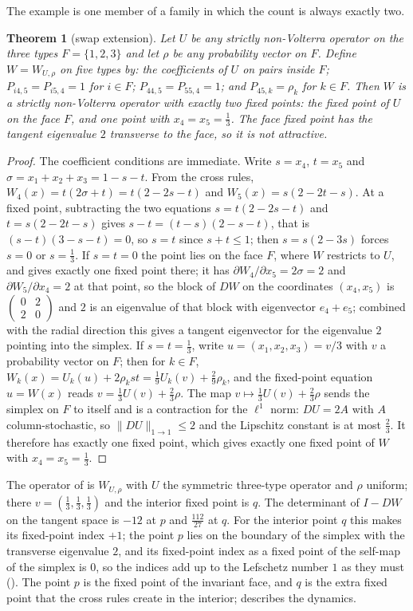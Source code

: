 \documentclass[11pt]{amsart}
\newtheorem{theorem}{Theorem}[section]
\theoremstyle{definition}
\begin{document}
The example is one member of a family in which the count is always exactly two.

\begin{theorem}[swap extension]\label{thm:swap}
Let $U$ be any strictly non-Volterra operator on the three types $F=\{1,2,3\}$ and let $\rho$ be any probability vector on $F$. Define $W=W_{U,\rho}$ on five types by: the coefficients of $U$ on pairs inside $F$; $P_{i4,5}=P_{i5,4}=1$ for $i\in F$; $P_{44,5}=P_{55,4}=1$; and $P_{45,k}=\rho_k$ for $k\in F$. Then $W$ is a strictly non-Volterra operator with exactly two fixed points: the fixed point of $U$ on the face $F$, and one point with $x_4=x_5=\frac13$. The face fixed point has the tangent eigenvalue $2$ transverse to the face, so it is not attractive.
\end{theorem}

\begin{proof}
The coefficient conditions are immediate. Write $s=x_4$, $t=x_5$ and $\sigma=x_1+x_2+x_3=1-s-t$. From the cross rules, $W_4(x)=t(2\sigma+t)=t(2-2s-t)$ and $W_5(x)=s(2-2t-s)$. At a fixed point, subtracting the two equations $s=t(2-2s-t)$ and $t=s(2-2t-s)$ gives $s-t=(t-s)(2-s-t)$, that is $(s-t)(3-s-t)=0$, so $s=t$ since $s+t\le1$; then $s=s(2-3s)$ forces $s=0$ or $s=\frac13$. If $s=t=0$ the point lies on the face $F$, where $W$ restricts to $U$, and  gives exactly one fixed point there; it has $\partial W_4/\partial x_5=2\sigma=2$ and $\partial W_5/\partial x_4=2$ at that point, so the block of $DW$ on the coordinates $(x_4,x_5)$ is $\begin{pmatrix}0&2\\2&0\end{pmatrix}$ and $2$ is an eigenvalue of that block with eigenvector $e_4+e_5$; combined with the radial direction this gives a tangent eigenvector for the eigenvalue $2$ pointing into the simplex. If $s=t=\frac13$, write $u=(x_1,x_2,x_3)=v/3$ with $v$ a probability vector on $F$; then for $k\in F$, $W_k(x)=U_k(u)+2\rho_kst=\frac19U_k(v)+\frac29\rho_k$, and the fixed-point equation $u=W(x)$ reads $v=\frac13U(v)+\frac23\rho$. The map $v\mapsto\frac13U(v)+\frac23\rho$ sends the simplex on $F$ to itself and is a contraction for the $\ell^1$ norm: $DU=2A$ with $A$ column-stochastic, so $\|DU\|_{1\to1}\le2$ and the Lipschitz constant is at most $\frac23$. It therefore has exactly one fixed point, which gives exactly one fixed point of $W$ with $x_4=x_5=\frac13$.
\end{proof}

The operator of  is $W_{U,\rho}$ with $U$ the symmetric three-type operator and $\rho$ uniform; there $v=(\frac13,\frac13,\frac13)$ and the interior fixed point is $q$. The determinant of $I-DW$ on the tangent space is $-12$ at $p$ and $\frac{112}{27}$ at $q$. For the interior point $q$ this makes its fixed-point index $+1$; the point $p$ lies on the boundary of the simplex with the transverse eigenvalue $2$, and its fixed-point index as a fixed point of the self-map of the simplex is $0$, so the indices add up to the Lefschetz number $1$ as they must (). The point $p$ is the fixed point of the invariant face, and $q$ is the extra fixed point that the cross rules create in the interior;  describes the dynamics.
\end{document}
